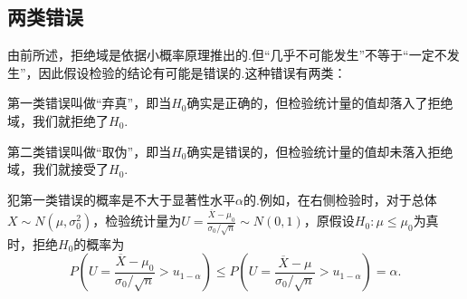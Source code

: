 \subsection{两类错误}
由前所述，拒绝域是依据小概率原理推出的.但“几乎不可能发生”不等于“一定不发生”，因此假设检验的结论有可能是错误的.这种错误有两类：

第一类错误叫做“弃真”，即当\(H_0\)确实是正确的，但检验统计量的值却落入了拒绝域，我们就拒绝了\(H_0\).

第二类错误叫做“取伪”，即当\(H_0\)确实是错误的，但检验统计量的值却未落入拒绝域，我们就接受了\(H_0\).

犯第一类错误的概率是不大于显著性水平\(\alpha\)的.例如，在右侧检验时，对于总体\(X \sim N(\mu,\sigma_0^2)\)，检验统计量为\(U = \frac{\overline{X}-\mu_0}{\sigma_0 / \sqrt{n}} \sim N(0,1)\)，原假设\(H_0: \mu\leq\mu_0\)为真时，拒绝\(H_0\)的概率为\[
P\left(U=\frac{\overline{X}-\mu_0}{\sigma_0 / \sqrt{n}}>u_{1-\alpha}\right) \leq P\left(U=\frac{\overline{X}-\mu}{\sigma_0 / \sqrt{n}}>u_{1-\alpha}\right) = \alpha.
\]
